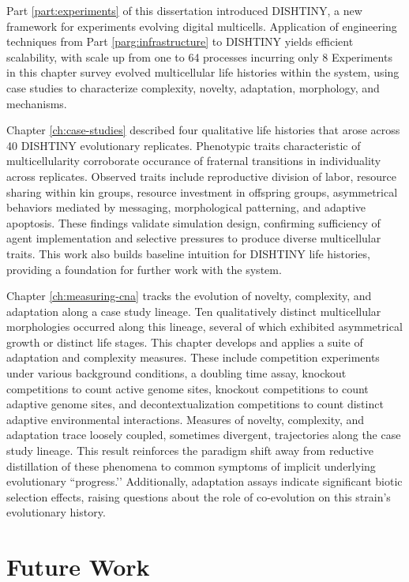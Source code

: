 Part \ref{part:experiments} of this dissertation introduced DISHTINY, a new framework for experiments evolving digital multicells. Application of engineering techniques from Part \ref{parg:infrastructure} to DISHTINY yields efficient scalability, with scale up from one to 64 processes incurring only 8%
Experiments in this chapter survey evolved multicellular life histories within the system, using case studies to characterize complexity, novelty, adaptation, morphology, and mechanisms.

Chapter \ref{ch:case-studies} described four qualitative life histories that arose across 40 DISHTINY evolutionary replicates.
Phenotypic traits characteristic of multicellularity corroborate occurance of fraternal transitions in individuality across replicates.
Observed traits include reproductive division of labor, resource sharing within kin groups, resource investment in offspring groups, asymmetrical behaviors mediated by messaging, morphological patterning, and adaptive apoptosis.
These findings validate simulation design, confirming sufficiency of agent implementation and selective pressures to produce diverse multicellular traits.
This work also builds baseline intuition for DISHTINY life histories, providing a foundation for further work with the system.

Chapter \ref{ch:measuring-cna} tracks the evolution of novelty, complexity, and adaptation along a case study lineage.
Ten qualitatively distinct multicellular morphologies occurred along this lineage, several of which exhibited asymmetrical growth or distinct life stages.
This chapter develops and applies a suite of adaptation and complexity measures.
These include competition experiments under various background conditions, a doubling time assay, knockout competitions to count active genome sites, knockout competitions to count adaptive genome sites, and decontextualization competitions to count distinct adaptive environmental interactions.
Measures of novelty, complexity, and adaptation trace loosely coupled, sometimes divergent, trajectories along the case study lineage.
This result reinforces the paradigm shift away from reductive distillation of these phenomena to common symptoms of implicit underlying evolutionary ``progress.’’
Additionally, adaptation assays indicate significant biotic selection effects, raising questions about the role of co-evolution on this strain’s evolutionary history.

\section{Future Work}

